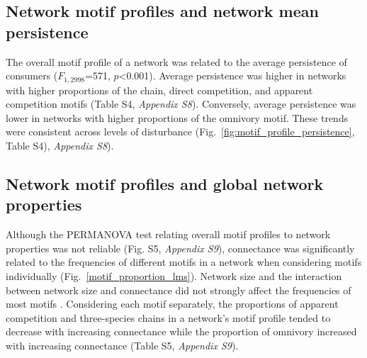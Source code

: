 \documentclass[12pt]{article}
\begin{document}
\begin{spacing}{2.0}
    \subsection*{Network motif profiles and network mean persistence}
    
        The overall motif profile of a network was related to the average persistence of consumers ($F_{1,2998}$=571, $p$\textless0.001). 
        Average persistence was higher in networks with higher proportions of the chain, direct competition, and apparent competition motifs (Table S4, \emph{Appendix S8}). 
        Conversely, average persistence was lower in networks with higher proportions of the omnivory motif. 
        These trends were consistent across levels of disturbance (Fig.~\ref{fig:motif_profile_persistence}, Table S4), \emph{Appendix S8}).%


    \subsection*{Network motif profiles and global network properties}

        Although the PERMANOVA test relating overall motif profiles to network properties was not reliable (Fig. S5, \emph{Appendix S9}), 
        connectance was significantly related to the frequencies of different motifs in a network when considering motifs individually (Fig.~\ref{motif_proportion_lms}).
        Network size and the interaction between network size and connectance did not strongly affect the frequencies of most motifs .
        Considering each motif separately, the proportions of apparent competition and three-species chains in a network's motif profile tended to decrease with increasing connectance while the proportion of omnivory increased with increasing connectance (Table S5, \emph{Appendix S9}). 
    








\end{spacing}
\end{document}
